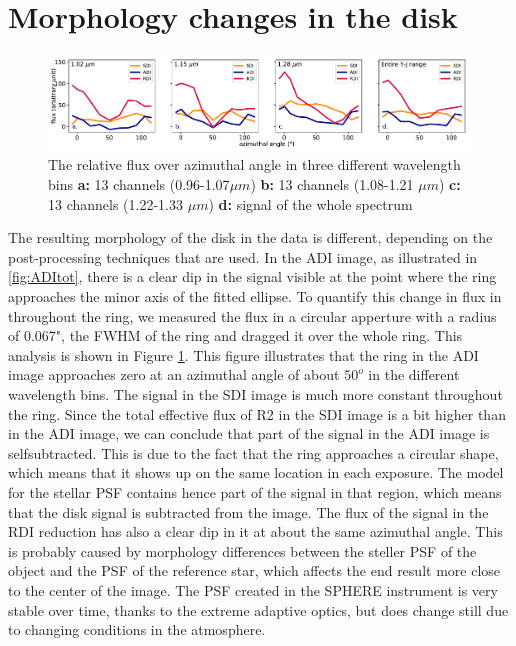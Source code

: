 \documentclass[twoside,single]{lion-msc}
\begin{document}
\section{Morphology changes in the disk}
\begin{figure}[!b]
\centering
\includegraphics[trim={0cm 0cm 0cm 0cm},clip,width = \textwidth]{coloroverangle_rdi}
\caption{The relative flux over azimuthal angle in three different wavelength bins \textbf{a:} 13 channels (0.96-1.07$\mu m$) \textbf{b:} 13 channels (1.08-1.21 $\mu m$) \textbf{c:} 13 channels (1.22-1.33 $\mu m$) \textbf{d:} signal of the whole spectrum}
\label{fig:coloroverangle}
\end{figure}

The resulting morphology of the disk in the data is different, depending on the post-processing techniques that are used. In the ADI image, as illustrated in \ref{fig:ADItot}, there is a clear dip in the signal visible at the point where the ring approaches the minor axis of the fitted ellipse. To quantify this change in flux in throughout the ring, we measured the flux in a circular apperture with a radius of 0.067", the FWHM of the ring and dragged it over the whole ring. This analysis is shown in Figure \ref{fig:coloroverangle}. This figure illustrates that the ring in the ADI image approaches zero at an azimuthal angle of about $50^o$ in the different wavelength bins. The signal in the SDI image is much more constant throughout the ring. Since the total effective flux of R2 in the SDI image is a bit higher than in the ADI image, we can conclude that part of the signal in the ADI image is selfsubtracted. This is due to the fact that the ring approaches a circular shape, which means that it shows up on the same location in each exposure. The model for the stellar PSF contains hence part of the signal in that region, which means that the disk signal is subtracted from the image. The flux of the signal in the RDI reduction has also a clear dip in it at about the same azimuthal angle. This is probably caused by morphology differences between the steller PSF of the object and the PSF of the reference star, which affects the end result more close to the center of the image. The PSF created in the SPHERE instrument is very stable over time, thanks to the extreme adaptive optics, but does change still due to changing conditions in the atmosphere.
\bigskip
\end{document}
